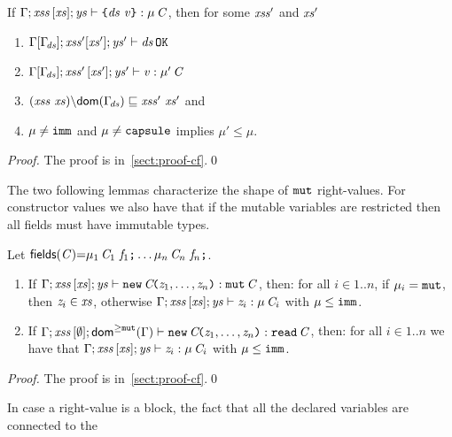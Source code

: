 {\begin{lemma} \label{lemma:inversionBlock}
If ${\Gamma};\mathit{xss}\,[\mathit{xs}];\mathit{ys}\vdash \texttt{\{}\mathit{ds}\ \mathit{v}\texttt{\}}:\mu\,\mathit{C}$, then for some $\mathit{xss}'$ and $\mathit{xs}'$
\begin{enumerate}
\item $\Gamma[\Gamma_{\!\mathit{ds}}];\mathit{xss}'[\mathit{xs}'];\mathit{ys}'\vdash \mathit{ds}\,{\tt OK}$
\item  ${\Gamma[\Gamma_{\!\mathit{ds}}]};{\mathit{xss}'}\,[\mathit{xs}'];\mathit{ys}'\vdash \mathit{v}:\mu'\,\mathit{C}$ 
\item $\LessEq{(\LentLocked\ \xs){\setminus}\dom{\TypeEnv{\decs}}}{\LentLocked'\ \xs'}$ and
\item $\mu\not=\texttt{imm}$ and $\mu\not=\texttt{capsule}$ implies $\mu'\leq\mu$.
\end{enumerate}
\end{lemma}
\begin{proof}
The proof is in~\ref{sect:proof-cf}.\qed
\end{proof}
The two following lemmas characterize the shape of $\texttt{mut}$ right-values. 
For constructor values we also have that if the mutable variables are restricted then all fields
must have immutable types.
\begin{lemma}\label{lemma:constrMut}
Let $\textsf{fields}(\mathit{C}){=}\mu_1\,\mathit{C}_1\ \mathit{f}_1\texttt{;}\ldots\mu_n\,\mathit{C}_n\ \mathit{f}_n\texttt{;}$.
\begin{enumerate}
  \item If $\Gamma;\mathit{xss}\,[\mathit{xs}];\mathit{ys}\vdash \texttt{new}\,\mathit{C}\!\texttt{(}\mathit{z}_1,\ldots,\mathit{z}_n\texttt{)}:\texttt{mut}\,\mathit{C}$, then: for all $i\in1..n$, if $\mu_i=\texttt{mut}$, then $\mathit{z}_i\in\mathit{xs}$, otherwise $\Gamma;\mathit{xss}\,[\mathit{xs}];\mathit{ys}\vdash \mathit{z}_i:\mu\,\mathit{C}_i$ with $\mu\leq\texttt{imm}$.
\item If $\Gamma;\mathit{xss}\,[\emptyset];{\textsf{dom}^{\geq\texttt{mut}}}(\Gamma) \vdash \texttt{new}\,\mathit{C}\!\texttt{(}\mathit{z}_1,\ldots,\mathit{z}_n\texttt{)}:\texttt{read}\,\mathit{C}$, then: for all $i\in1..n$ we have that $\Gamma;\mathit{xss}\,[\mathit{xs}];\mathit{ys}\vdash \mathit{z}_i:\mu\,\mathit{C}_i$ with $\mu\leq\texttt{imm}$.
\end{enumerate}
\end{lemma}
\begin{proof}
The proof is in~\ref{sect:proof-cf}.\qed
\end{proof}
In case a right-value is a  block, the fact that all the declared variables are connected to the
}

